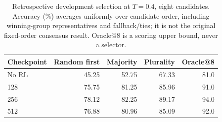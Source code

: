 \begin{table}[t]
\centering
\caption{Retrospective development selection at $T=0.4$, eight candidates. Accuracy (\%) averages uniformly over candidate order, including winning-group representatives and fallback/ties; it is not the original fixed-order consensus result. Oracle@8 is a scoring upper bound, never a selector.}
\label{tab:selection_rules}
\footnotesize
\setlength{\tabcolsep}{4pt}
\begin{tabular}{lrrrr}
\toprule
Checkpoint & Random first & Majority & Plurality & Oracle@8\\
\midrule
No RL & 45.25 & 52.75 & 67.33 & 81.0\\
128 & 75.75 & 81.25 & 85.96 & 91.0\\
256 & 78.12 & 82.25 & 89.17 & 94.0\\
512 & 76.88 & 80.96 & 85.09 & 92.0\\
\bottomrule
\end{tabular}
\end{table}
